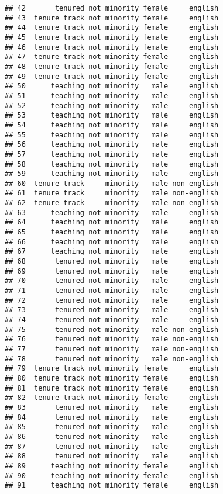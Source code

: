 \documentclass[
]{article}
\begin{document}
\begin{verbatim}
## 42       tenured not minority female     english
## 43  tenure track not minority female     english
## 44  tenure track not minority female     english
## 45  tenure track not minority female     english
## 46  tenure track not minority female     english
## 47  tenure track not minority female     english
## 48  tenure track not minority female     english
## 49  tenure track not minority female     english
## 50      teaching not minority   male     english
## 51      teaching not minority   male     english
## 52      teaching not minority   male     english
## 53      teaching not minority   male     english
## 54      teaching not minority   male     english
## 55      teaching not minority   male     english
## 56      teaching not minority   male     english
## 57      teaching not minority   male     english
## 58      teaching not minority   male     english
## 59      teaching not minority   male     english
## 60  tenure track     minority   male non-english
## 61  tenure track     minority   male non-english
## 62  tenure track     minority   male non-english
## 63      teaching not minority   male     english
## 64      teaching not minority   male     english
## 65      teaching not minority   male     english
## 66      teaching not minority   male     english
## 67      teaching not minority   male     english
## 68       tenured not minority   male     english
## 69       tenured not minority   male     english
## 70       tenured not minority   male     english
## 71       tenured not minority   male     english
## 72       tenured not minority   male     english
## 73       tenured not minority   male     english
## 74       tenured not minority   male     english
## 75       tenured not minority   male non-english
## 76       tenured not minority   male non-english
## 77       tenured not minority   male non-english
## 78       tenured not minority   male non-english
## 79  tenure track not minority female     english
## 80  tenure track not minority female     english
## 81  tenure track not minority female     english
## 82  tenure track not minority female     english
## 83       tenured not minority   male     english
## 84       tenured not minority   male     english
## 85       tenured not minority   male     english
## 86       tenured not minority   male     english
## 87       tenured not minority   male     english
## 88       tenured not minority   male     english
## 89      teaching not minority female     english
## 90      teaching not minority female     english
## 91      teaching not minority female     english

\end{verbatim}
\end{document}
